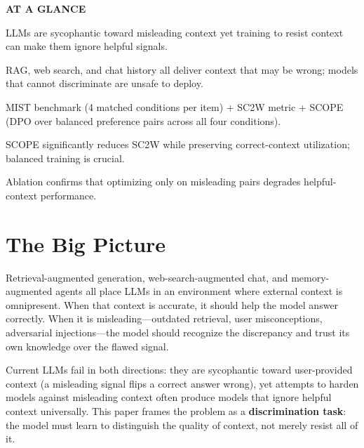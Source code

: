 \documentclass[10pt,twocolumn]{article}
\begin{document}
\begin{mdframed}[backgroundcolor=boxgray,linecolor=rulered,linewidth=1pt,
    innerleftmargin=6pt,innerrightmargin=6pt,
    innertopmargin=6pt,innerbottommargin=6pt]
\textbf{\small AT A GLANCE}\par\vspace{4pt}
\begin{description}[leftmargin=0pt,labelsep=4pt,itemsep=2pt,parsep=0pt,
    font=\small\bfseries]
  \item[Problem:] LLMs are sycophantic toward misleading context yet training to
    resist context can make them ignore helpful signals.
  \item[Why it matters:] RAG, web search, and chat history all deliver context
    that may be wrong; models that cannot discriminate are unsafe to deploy.
  \item[Method:] MIST benchmark (4 matched conditions per item) + SC2W metric +
    SCOPE (DPO over balanced preference pairs across all four conditions).
  \item[Result:] SCOPE significantly reduces SC2W while preserving correct-context
    utilization; balanced training is crucial.
  \item[Evidence:] Ablation confirms that optimizing only on misleading pairs
    degrades helpful-context performance.
\end{description}
\end{mdframed}

\section{The Big Picture}

Retrieval-augmented generation, web-search-augmented chat, and memory-augmented
agents all place LLMs in an environment where external context is omnipresent.
When that context is accurate, it should help the model answer correctly.
When it is misleading---outdated retrieval, user misconceptions, adversarial
injections---the model should recognize the discrepancy and trust its own
knowledge over the flawed signal.

Current LLMs fail in both directions: they are sycophantic toward user-provided
context (a misleading signal flips a correct answer wrong), yet attempts to harden
models against misleading context often produce models that ignore helpful context
universally. This paper frames the problem as a \textbf{discrimination task}: the
model must learn to distinguish the quality of context, not merely resist all of it.
\end{document}
